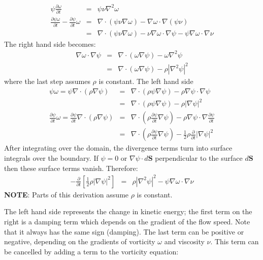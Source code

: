 \documentclass[12pt,a4paper]{article}
\newcommand{\lr}[1]{\left( #1 \right)}
\begin{document}
\begin{eqnarray}
  \psi \frac{\partial\omega}{\partial t} &=& \psi\nu\nabla^2\omega \\
  \frac{\partial\psi\omega}{\partial t} - \frac{\partial\psi}{\partial t}\omega &=& \nabla\cdot\left(\psi\nu\nabla\omega\right) - \nabla\omega\cdot\nabla\left(\psi\nu\right) \\
  &=&  \nabla\cdot\left(\psi\nu\nabla\omega\right) -\nu \nabla\omega\cdot\nabla\psi - \psi\nabla\omega\cdot\nabla\nu 
\end{eqnarray}
The right hand side becomes:
\begin{eqnarray}
  \nabla\omega\cdot\nabla\psi &=& \nabla\cdot\lr{\omega\nabla\psi} - \omega\nabla^2\psi \\
  &=& \nabla\cdot\lr{\omega\nabla\psi} - \rho\left|\nabla^2\psi\right|^2
\end{eqnarray}
where the last step assumes $\rho$ is constant. The left hand side
\begin{eqnarray}
  \psi\omega = \psi\nabla\cdot\lr{\rho\nabla\psi} &=& \nabla\cdot\lr{\rho\psi\nabla\psi} -\rho\nabla\psi\cdot\nabla\psi  \\
  &=& \nabla\cdot\lr{\rho\psi\nabla\psi} -\rho\left|\nabla\psi\right|^2 \\
  \frac{\partial\psi}{\partial t}\omega = \frac{\partial\psi}{\partial t}\nabla\cdot\lr{\rho\nabla\psi} &=& \nabla\cdot\lr{\rho\frac{\partial\psi}{\partial t}\nabla\psi} - \rho\nabla\psi\cdot\nabla\frac{\partial\psi}{\partial t} \\
  &=& \nabla\cdot\lr{\rho\frac{\partial\psi}{\partial t}\nabla\psi} - \frac{1}{2}\rho\frac{\partial}{\partial t}\left|\nabla\psi\right|^2
\end{eqnarray}
After integrating over the domain, the divergence terms turn into surface integrals over the boundary. If $\psi = 0$ or $\nabla\psi\cdot d\mathbf{S}$ perpendicular to the surface $d\mathbf{S}$ then these surface terms vanish. Therefore:
\begin{eqnarray}
 -\frac{\partial}{\partial t}\left[\frac{1}{2}\rho\left|\nabla\psi\right|^2\right] &=& \rho\left|\nabla^2\psi\right|^2 - \psi\nabla\omega\cdot\nabla\nu
\end{eqnarray}
{\bf NOTE}: Parts of this derivation assume $\rho$ is constant.
    
The left hand side represents the change in kinetic energy; the first term on the right
is a damping term which depends on the gradient of the flow speed.
Note that it always has the same sign (damping). The last term can be positive
or negative, depending on the gradients of vorticity
$\omega$ and viscosity $\nu$. This term can be cancelled by adding a term
to the vorticity equation:
\end{document}

